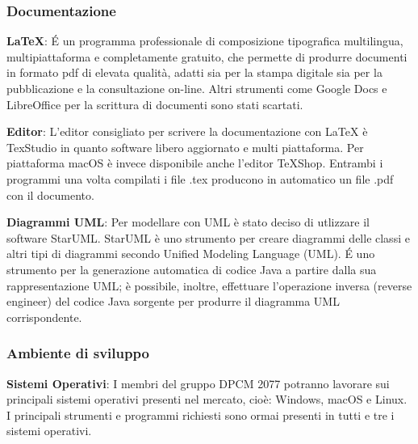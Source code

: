 \subsubsection{Documentazione} 
\begin{description}
\item{\textbf{\LaTeX}}: \'E un programma professionale di composizione tipografica multilingua,
multipiattaforma e completamente gratuito, che permette di produrre documenti in formato pdf di elevata qualità, adatti sia per la stampa digitale sia
per la pubblicazione e la consultazione on-line. 
Altri strumenti come Google Docs e LibreOffice per la scrittura di documenti sono stati scartati. 

\item{\textbf{Editor}}: L’editor  consigliato  per  scrivere  la  documentazione  con  {\LaTeX}  è TexStudio  in  quanto  software  libero  aggiornato  e  multi  piattaforma. Per piattaforma macOS è invece disponibile
anche l'editor TeXShop. Entrambi i programmi una volta compilati i file .tex producono in automatico un file .pdf con il documento.

\item{\textbf{Diagrammi UML}}: Per modellare con UML è stato deciso di utlizzare il software StarUML. StarUML è uno strumento per creare diagrammi delle classi e altri tipi di diagrammi secondo Unified Modeling Language (UML). 
\'E uno strumento per la generazione automatica di codice Java a partire dalla sua rappresentazione UML; è possibile, inoltre, effettuare l’operazione inversa (reverse engineer) del codice Java sorgente per produrre il diagramma UML corrispondente. 
\end{description}

\subsubsection{Ambiente di sviluppo}
\begin{description}
\item{\textbf{Sistemi Operativi}}: I membri del gruppo DPCM 2077 potranno lavorare sui principali sistemi operativi presenti nel mercato, cioè: Windows, macOS e Linux.
I principali strumenti e programmi richiesti sono ormai presenti in tutti e tre i sistemi operativi.
\end{description}


